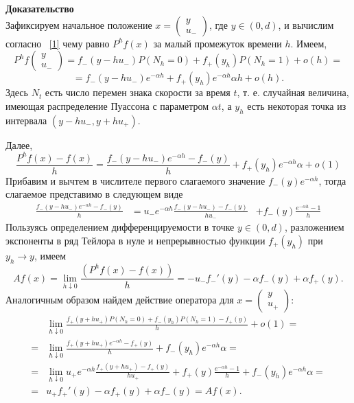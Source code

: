 \documentclass[12pt,a4paper]{article}
\begin{document}
{\bf Доказательство}\\
Зафиксируем начальное положение $x = \begin{pmatrix}
 y \\
 u_-
\end{pmatrix} $, где $y \in (0, d)$, и вычислим согласно ~\eqref{1} чему равно $P^h f (x) $ за малый промежуток времени $h$.
Имеем,
$$P^h f  \begin{pmatrix}
 y \\
 u_-
\end{pmatrix}  = f_- (y - h u_-) P (N_h = 0) + f_+ (y_h) P(N_h = 1) + o (h) =$$
$$ = f_- (y - h u_-) e^{- \alpha h} + f_+ (y_h) e^{- \alpha h} \alpha h + o(h).$$
Здесь $N_t$ есть число перемен знака скорости за время $t$, т. е. случайная величина, имеющая распределение Пуассона с параметром $\alpha t$, а $y_h$ есть некоторая точка из интервала $(y - h u_-, y + h u_+)$.

Далее,
$$\frac{P^h f (x) - f(x)}{h} = \frac{f_- (y - h u_-) e^{-\alpha h} - f_- (y)}{h} + f_+ (y_h) e^{- \alpha h} \alpha + o (1)$$
Прибавим и вычтем в числителе первого слагаемого значение $f_- (y) e^{- \alpha h}$, тогда слагаемое представимо в следующем виде
\begin{equation*}
    \begin{aligned}
   \frac{f_- (y - h u_-) e^{-\alpha h} - f_- (y)}{h} &= u_- e^{- \alpha h} \frac{f_- (y - h u_-) - f_- (y)}{h u_-}
    &+ f_- (y) \frac{e^{- \alpha h} - 1}{h}
    \end{aligned}
\end{equation*}
Пользуясь определением дифференцируемости в точке $y \in (0, d)$, разложением экспоненты в ряд Тейлора в нуле и непрерывностью функции $f_+ (y_h)$ при $y_h \to y$, имеем
$$ A f(x) = \lim_{h \downarrow 0} \frac{\left( P^h f(x) - f(x) \right)}{h} = -u_- f_-' (y) - \alpha f_- (y) + \alpha f_+ (y).$$
Аналогичным образом найдем действие оператора для $x = \begin{pmatrix}
 y \\
 u_+
\end{pmatrix}:$
\begin{equation*}
    \begin{aligned}
  &\lim_{h \downarrow 0} \frac{ f_+ (y + h u_+) P (N_h = 0) + f_- (y_h) P(N_h = 1) - f_+(y) }{h} + o(1) = \\
 = &\lim_{h \downarrow 0} \frac{f_+ (y + h u_+) e^{-\alpha h} - f_+ (y)}{h} + f_- (y_h) e^{- \alpha h} \alpha  = \\
= &\lim_{h \downarrow 0} u_+ e^{- \alpha h} \frac{f_+ (y + h u_+) - f_+ (y)}{h u_+} + f_+ (y) \frac{e^{- \alpha h} - 1}{h} + f_- (y_h) e^{- \alpha h} \alpha = \\
 = &u_+ f_+' (y) - \alpha f_+ (y) + \alpha f_- (y) = A f (x).
    \end{aligned}
\end{equation*}
\end{document}
